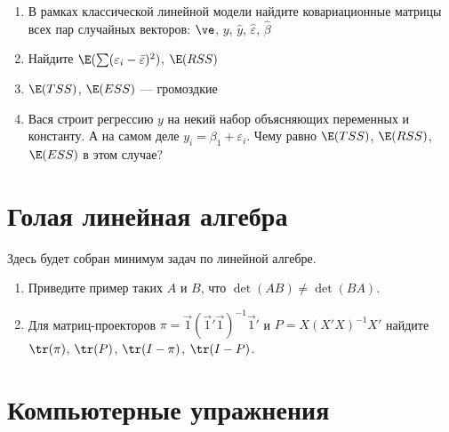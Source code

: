 \documentclass[pdftex,12pt,a4paper]{article}
\def \hb{\hat{\beta}}
\def \hy{\hat{y}}
\def \he{\hat{\varepsilon}}
\def \v1{\vec{1}}
\def \e{\varepsilon}
\newcommand{\solution}[1]{}
\newcommand{\problem}[1]{#1}
\begin{document}
\begin{enumerate}
\item В рамках классической линейной модели найдите ковариационные матрицы всех пар случайных векторов: $\ve$, $y$, $\hy$, $\he$, $\hb$
\solution{$\Var(\hb)=\sigma^2 (X'X)^{-1}$}

\item Найдите $\E(\sum (\e_i-\bar{\e})^2 )$, $\E(RSS)$
\solution{ $(n-1)\sigma^2$, $(n-k)\sigma^2$}

\item $\E(TSS)$, $\E(ESS)$ --- громоздкие 
\solution{ $\E(TSS)=(n-1)\sigma^2+\beta'X'(I-\pi)X\beta$}

\item Вася строит регрессию $y$ на некий набор объясняющих переменных и константу. А на самом деле $y_i=\beta_1+\e_i$. Чему равно $\E(TSS)$, $\E(RSS)$, $\E(ESS)$ в этом случае?
\solution{ $(n-1)\sigma^2$, $(n-k)\sigma^2$, $(k-1)\sigma^2$}

\end{enumerate}



\section{Голая линейная алгебра}

Здесь будет собран минимум задач по линейной алгебре.

\begin{enumerate}
\item \problem{Приведите пример таких $A$ и $B$, что $\det(AB)\neq \det(BA)$.}
\solution{Например, $A=(1,2,3)$, $B=(1,0,1)'$}

\item Для матриц-проекторов $\pi=\v1(\v1'\v1)^{-1}\v1'$ и $P=X(X'X)^{-1}X'$ найдите $\tr(\pi)$, $\tr(P)$, $\tr(I-\pi)$, $\tr(I-P)$.
\solution{$\tr(I)=n$, $\tr(\pi)=1$, $\tr(P)=k$ }


 
\end{enumerate}


\section{Компьютерные упражнения}
\end{document}
